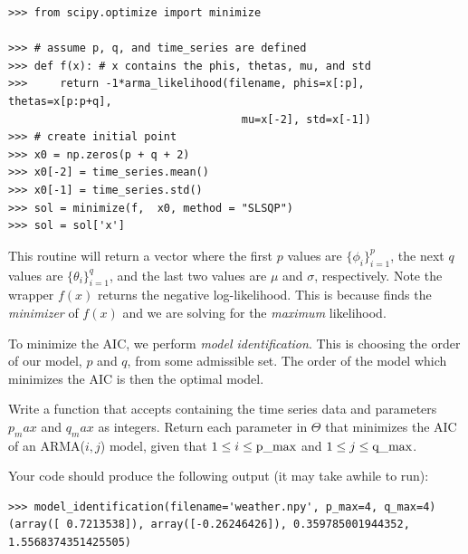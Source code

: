 \begin{lstlisting}
>>> from scipy.optimize import minimize

>>> # assume p, q, and time_series are defined
>>> def f(x): # x contains the phis, thetas, mu, and std
>>>     return -1*arma_likelihood(filename, phis=x[:p], thetas=x[p:p+q], 
                                    mu=x[-2], std=x[-1])
>>> # create initial point
>>> x0 = np.zeros(p + q + 2)
>>> x0[-2] = time_series.mean()
>>> x0[-1] = time_series.std()
>>> sol = minimize(f,  x0, method = "SLSQP")
>>> sol = sol['x']
\end{lstlisting}

This routine will return a vector  where the first $p$ values are $\{\phi_i\}_{i=1}^p$, the next $q$ values are $\{\theta_i\}_{i=1}^q$, and the last two values are $\mu$ and $\sigma$, respectively.
Note the wrapper $f(x)$ returns the negative log-likelihood.
This is because  finds the \emph{minimizer} of $f(x)$ and we are solving for the \emph{maximum} likelihood.

To minimize the AIC, we perform \emph{model identification}.
This is choosing the order of our model, $p$ and $q$, from some admissible set.
The order of the model which minimizes the AIC is then the optimal model.

\begin{problem}
\label{prob:model-identification}
Write a function  that accepts  containing the time series data and parameters $p_max$ and $q_max$ as integers. 
Return each parameter in $\Theta$ that minimizes the AIC of an ARMA($i,j$) model, given that $1\leq i \leq \text{\li{p_max}}$ and $1\leq j \leq \text{\li{q_max}}$.

Your code should produce the following output (it may take awhile to run):
\begin{lstlisting}
>>> model_identification(filename='weather.npy', p_max=4, q_max=4)
(array([ 0.7213538]), array([-0.26246426]), 0.359785001944352, 1.5568374351425505)
\end{lstlisting}
\end{problem}

